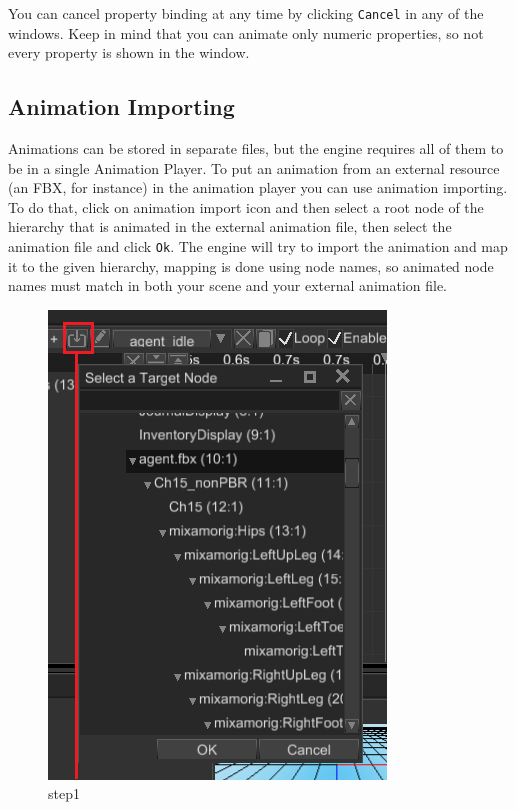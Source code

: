 \documentclass[
]{book}
\theoremstyle{definition}
\theoremstyle{definition}
\theoremstyle{definition}
\theoremstyle{definition}
\theoremstyle{remark}
\begin{document}
You can cancel property binding at any time by clicking \texttt{Cancel} in any of the windows. Keep in mind that you can animate only numeric properties, so not every property is shown in the window.

\subsection{Animation Importing}\label{animation-importing}

Animations can be stored in separate files, but the engine requires all of them to be in a single Animation Player. To put an animation from an external resource (an FBX, for instance) in the animation player you can use animation importing. To do that, click on animation import icon and then select a root node of the hierarchy that is animated in the external animation file, then select the animation file and click \texttt{Ok}. The engine will try to import the animation and map it to the given hierarchy, mapping is done using node names, so animated node names must match in both your scene and your external animation file.

\begin{figure}
\centering
\includegraphics{images/animation/ae_import_select_target_node.png}
\caption{step1}
\end{figure}
\end{document}
